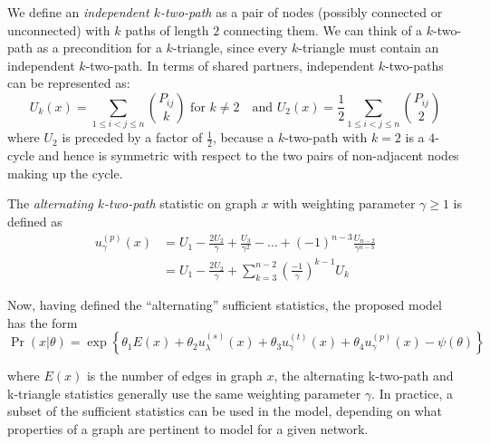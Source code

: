 We define an \emph{independent $k$-two-path} as a pair of nodes (possibly connected or unconnected) with $k$ paths of length $2$ connecting them. We can think of a $k$-two-path as a precondition for a $k$-triangle, since every $k$-triangle must contain an independent $k$-two-path. In terms of shared partners, independent $k$-two-paths can be represented as:
\begin{equation}
\label{eq:k-two-path}
U_k(x) = \sum_{1 \leq i < j \leq n} \binom{P_{ij}}{k} \text{ for } k \not= 2 \quad \text{and } U_2(x) = \frac{1}{2} \sum_{1 \leq i < j \leq n} \binom{P_{ij}}{2}
\end{equation}
where $U_2$ is preceded by a factor of $\frac{1}{2}$, because a $k$-two-path with $k=2$ is a $4$-cycle and hence is symmetric with respect to the two pairs of non-adjacent nodes making up the cycle.

\begin{definition}
	\label{def:altktwopath}
	The \emph{alternating $k$-two-path} statistic on graph $x$ with weighting parameter $\gamma \geq 1$ is defined as 
	\begin{align*}
	u^{(p)}_\gamma(x) & = U_1 - \frac{2 U_2}{\gamma}   + \frac{U_3}{\gamma^2} - \dots + (-1)^{n-3} \frac{U_{n-2}}{\gamma^{n-3}} \\
	&  = U_1 - \frac{2 U_2}{\gamma} + \sum_{k = 3}^{n-2} \left(\frac{-1}{\gamma}\right)^{k-1} U_k
	\end{align*}
\end{definition}

Now, having defined the ``alternating'' sufficient statistics, the proposed model has the form
\begin{equation}
\label{eq:ergm_alt_stats}
\Pr(x | \theta) = \exp\left\{\theta_1 E(x) + \theta_2 u_\lambda^{(s)}(x) + \theta_3 u_\gamma^{(t)}(x)  + \theta_4 u_\gamma^{(p)}(x) - \psi(\theta)  \right\}
\end{equation}

where $E(x)$ is the number of edges in graph $x$, the alternating k-two-path and k-triangle statistics generally use the same weighting parameter $\gamma$. In practice, a subset of the sufficient statistics can be used in the model, depending on what properties of a graph are pertinent to model for a given network. 

